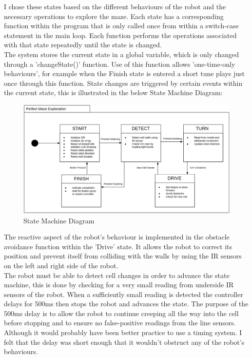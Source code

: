 \documentclass[a4paper]{article}
\begin{document}
	I chose these states based on the different behaviours of the robot and the necessary operations to explore the maze. Each state has a corresponding function within the program that is only called once from within a switch-case statement in the main loop. Each function performs the operations associated with that state repeatedly until the state is changed.\\
	
	The system stores the current state in a global variable, which is only changed through a 'changeState()' function. Use of this function allows 'one-time-only behaviours', for example when the Finish state is entered a short tune plays just once through this function. State changes are triggered by certain events within the current state, this is illustrated in the below State Machine Diagram:
	
	\begin{figure}[!htb]
		\centering
			\includegraphics[width=0.75\linewidth]{./img/smd.png}
			\caption{State Machine Diagram}
			\label{fig:state-diagram}
	\end{figure}
	
	The reactive aspect of the robot's behaviour is implemented in the obstacle avoidance function within the 'Drive' state. It allows the robot to correct its position and prevent itself from colliding with the walls by using the IR sensors on the left and right side of the robot.\\
	
	The robot must be able to detect cell changes in order to advance the state machine, this is done by checking for a very small reading from underside IR sensors of the robot. When a sufficiently small reading is detected the controller delays for 500ms then stops the robot and advances the state. The purpose of the 500ms delay is to allow the robot to continue creeping all the way into the cell before stopping and to ensure no false-positive readings from the line sensors. Although it would probably have been better practice to use a timing system. I felt that the delay was short enough that it wouldn't obstruct any of the robot's behaviours.
	
\end{document}
